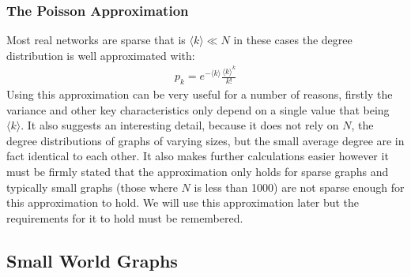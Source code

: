 \documentclass{article}
\begin{document}
            \subsubsection{The Poisson Approximation}
            Most real networks are sparse that is $\langle k \rangle \ll N$ in these cases the degree distribution is well approximated with:
            \begin{align*}
                p_{k} = e^{-\langle k \rangle}\frac{{\langle k \rangle}^k}{k!}
            \end{align*}
            Using this approximation can be very useful for a number of reasons, firstly the variance and other key characteristics only depend on a single value that being $\langle k \rangle$. It also suggests an interesting detail, because it does not rely on $N$, the degree distributions of graphs of varying sizes, but the small average degree are in fact identical to each other. It also makes further calculations easier however it must be firmly stated that the approximation only holds for sparse graphs and typically small graphs (those where $N$ is less than 1000) are not sparse enough for this approximation to hold. We will use this approximation later but the requirements for it to hold must be remembered.
        \subsection{Small World Graphs}
\end{document}
